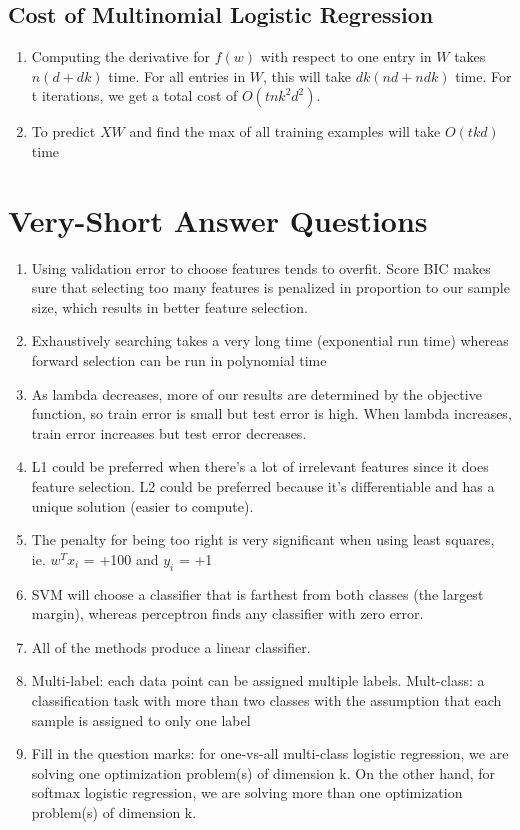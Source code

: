\documentclass{article}
\def\blu#1{{\color{blu}#1}}
\def\enum#1{\begin{enumerate}#1\end{enumerate}}
\begin{document}
\subsection{Cost of Multinomial Logistic Regression}

\enum{
\item \blu{Computing the derivative for $f(w)$ with respect to one entry in $W$ takes $n(d + dk)$ time. For all entries in $W$, this will take $dk(nd + ndk)$ time. For t iterations, we get a total cost of $O(tnk^2d^2)$}.
\item \blu{To predict $XW$ and find the max of all training examples will take $O(tkd)$ time}
}

\section{Very-Short Answer Questions}

\enum{
\item Using validation error to choose features tends to overfit. Score BIC makes sure that selecting too many features is penalized in proportion to our sample size, which results in better feature selection.
\item Exhaustively searching takes a very long time (exponential run time) whereas forward selection can be run in polynomial time
\item As lambda decreases, more of our results are determined by the objective function, so train error is small but test error is high. When lambda increases, train error increases but test error decreases. 
\item L1 could be preferred when there's a lot of irrelevant features since it does feature selection. L2 could be preferred because it's differentiable and has a unique solution (easier to compute). 
\item The penalty for being too right is very significant when using least squares, ie. $w^Tx_i$ = +100 and $y_i$ = +1 
\item SVM will choose a classifier that is farthest from both classes (the largest margin), whereas perceptron finds any classifier with zero error. 
\item All of the methods produce a linear classifier. 
\item Multi-label: each data point can be assigned multiple labels. Mult-class: a classification task with more than two classes with the assumption that each sample is assigned to only one label
\item Fill in the question marks: for one-vs-all multi-class logistic regression, we are solving \blu{one} optimization problem(s) of dimension \blu{k}. On the other hand, for softmax logistic regression, we are solving \blu{more than one} optimization problem(s) of dimension \blu{k}.
}
\end{document}
